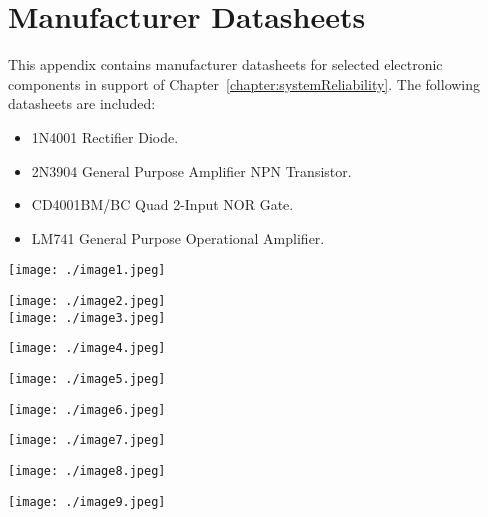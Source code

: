\chapter{Manufacturer Datasheets}
\label{appendix:manfDatasheet}
\graphicspath{ {./appendixD/Fig} }

This appendix contains manufacturer datasheets for selected electronic
components in support of Chapter~\ref{chapter:systemReliability}. 
The following datasheets are included:

\begin{itemize}
\item   1N4001 Rectifier Diode.
\item  2N3904 General Purpose Amplifier NPN Transistor.
\item  CD4001BM/BC Quad 2-Input NOR Gate.
\item  LM741 General Purpose Operational Amplifier.
\end{itemize}
  \texttt{[image: ./image1.jpeg]}
    
\texttt{[image: ./image2.jpeg]}\\

\texttt{[image: ./image3.jpeg]}

\texttt{[image: ./image4.jpeg]}

\texttt{[image: ./image5.jpeg]}

\texttt{[image: ./image6.jpeg]}

\texttt{[image: ./image7.jpeg]}

\texttt{[image: ./image8.jpeg]}

\texttt{[image: ./image9.jpeg]}
